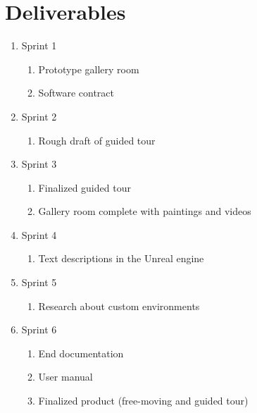 \documentclass[11pt]{article}
\begin{document}
\section{Deliverables}
\begin{enumerate}
\item Sprint 1
	\begin{enumerate}
	\item Prototype gallery room
	\item Software contract
	\end{enumerate}

\item Sprint 2
	\begin{enumerate}
	\item Rough draft of guided tour
	\end{enumerate}
	
\item Sprint 3
	\begin{enumerate}
	\item Finalized guided tour 
	\item Gallery room complete with paintings and videos
	\end{enumerate}

\item Sprint 4
	\begin{enumerate}
	\item Text descriptions in the Unreal engine
	\end{enumerate}
	
\item Sprint 5
	\begin{enumerate}
	\item Research about custom environments
	\end{enumerate}
	
\item Sprint 6
	\begin{enumerate}
	\item End documentation
	\item User manual
	\item Finalized product (free-moving and guided tour)
	\end{enumerate}
\end{enumerate}
\end{document}
